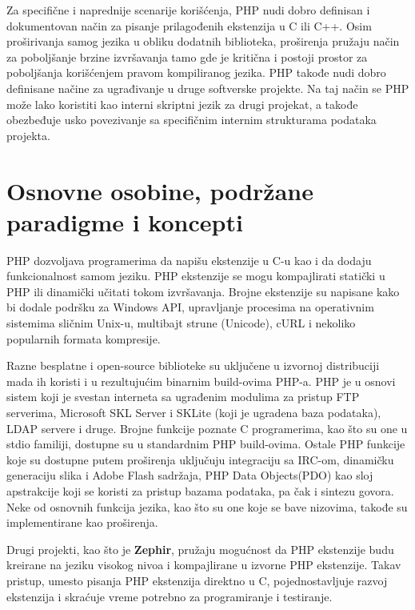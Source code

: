 \documentclass[a4paper]{article}
\begin{document}
{Za specifične i naprednije scenarije korišćenja, PHP nudi dobro definisan i dokumentovan način za pisanje prilagođenih ekstenzija u C ili C++. Osim proširivanja samog jezika u obliku dodatnih biblioteka, proširenja pružaju način za poboljšanje brzine izvršavanja tamo gde  je kritična i postoji prostor za poboljšanja korišćenjem pravom kompiliranog jezika. PHP takođe nudi dobro definisane načine za ugrađivanje u druge softverske projekte. Na taj način se PHP može lako koristiti kao interni skriptni jezik za drugi projekat, a takođe obezbeđuje usko povezivanje sa specifičnim internim strukturama podataka projekta.

\section{Osnovne osobine, podržane paradigme i koncepti}
PHP dozvoljava programerima da napišu ekstenzije u C-u kao i da dodaju funkcionalnost samom jeziku. PHP ekstenzije se mogu kompajlirati statički u PHP ili dinamički učitati tokom izvršavanja. Brojne ekstenzije su napisane kako bi dodale podršku za Windows API, upravljanje procesima na operativnim sistemima sličnim Unix-u, multibajt strune (Unicode), cURL i nekoliko popularnih formata kompresije.

Razne besplatne i open-source biblioteke su uključene u izvornoj distribuciji mada ih koristi i u rezultujućim binarnim build-ovima PHP-a. PHP je u osnovi sistem koji je svestan interneta sa ugrađenim modulima za pristup FTP serverima, Microsoft SKL Server i SKLite (koji je ugradena baza podataka), LDAP servere i druge. Brojne funkcije poznate C programerima, kao što su one u stdio familiji, dostupne su u standardnim PHP build-ovima. Ostale PHP funkcije koje su dostupne putem proširenja uključuju integraciju sa IRC-om, dinamičku generaciju slika i Adobe Flash sadržaja, PHP Data Objects(PDO) kao sloj apstrakcije koji se koristi za pristup bazama podataka, pa čak i sintezu govora. Neke od osnovnih funkcija jezika, kao što su one koje se bave nizovima, takođe su implementirane kao proširenja\cite{corePHP}.

Drugi projekti, kao što je \textbf{Zephir}\cite{zephir}, pružaju mogućnost da PHP ekstenzije budu kreirane na jeziku visokog nivoa i kompajlirane u izvorne PHP ekstenzije. Takav pristup, umesto pisanja PHP ekstenzija direktno u C, pojednostavljuje razvoj ekstenzija i skraćuje vreme potrebno za programiranje i testiranje. 

}
\end{document}
